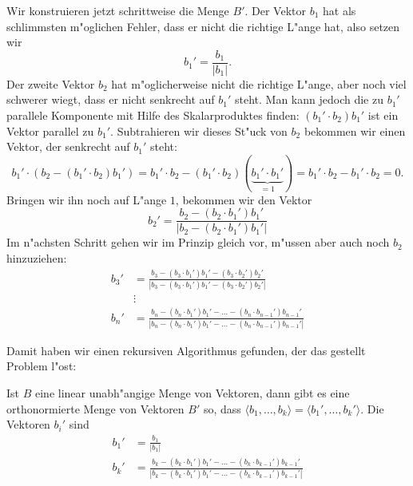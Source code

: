Wir konstruieren jetzt schrittweise die Menge $B'$.
Der Vektor $b_1$ hat als schlimmsten m"oglichen Fehler, dass er
nicht die richtige L"ange hat, also setzen wir
\[
b_1' = \frac{b_1}{|b_1|}.
\]
Der zweite Vektor $b_2$ hat m"oglicherweise nicht die richtige L"ange,
aber noch viel schwerer wiegt, dass er nicht senkrecht auf $b_1'$
steht. Man kann jedoch die zu $b_1'$ parallele Komponente mit Hilfe
des Skalarproduktes finden: $(b_1'\cdot b_2)b_1'$ ist ein Vektor
parallel zu $b_1'$. Subtrahieren wir dieses St"uck von $b_2$ bekommen
wir einen Vektor, der senkrecht auf $b_1'$ steht:
\[
b_1'\cdot(b_2-(b_1'\cdot b_2)b_1')=
b_1'\cdot b_2-(b_1'\cdot b_2)(\underbrace{b_1'\cdot b_1'}_{=1})
=
b_1'\cdot b_2-
b_1'\cdot b_2=0.
\]
Bringen wir ihn noch auf L"ange $1$, bekommen wir den Vektor
\[
b_2'=\frac{
b_2-(b_2\cdot b_1')b_1'
}{
|b_2-(b_2\cdot b_1')b_1'|
}
\]
Im n"achsten Schritt gehen wir im Prinzip gleich vor, m"ussen aber
auch noch $b_2$ hinzuziehen:
\begin{align*}
b_3'&=\frac{
b_3-(b_3\cdot b_1')b_1'-(b_3\cdot b_2')b_2'
}{
|b_3-(b_3\cdot b_1')b_1'-(b_3\cdot b_2')b_2'|
}
\\
&\vdots
\\
b_n'&=\frac{
b_n-(b_n\cdot b_1')b_1'-\dots-(b_n\cdot b_{n-1}')b_{n-1}'
}{
|b_n-(b_n\cdot b_1')b_1'-\dots-(b_n\cdot b_{n-1}')b_{n-1}'|
}
\end{align*}

Damit haben wir einen rekursiven Algorithmus gefunden,
der das gestellt Problem l"ost:

\begin{satz} Ist $B$ eine linear unabh"angige Menge von Vektoren,
dann gibt es eine orthonormierte Menge von Vektoren $B'$ so, dass
$\langle b_1,\dots,b_k\rangle=\langle b_1',\dots,b_k'\rangle$. Die
Vektoren $b_i'$ sind
\begin{align*}
b_1'&=\frac{b_1}{|b_1|}\\
b_k'&=\frac{b_k-(b_k\cdot b_1')b_1'-\dots -(b_k\cdot b_{k-1}')b_{k-1}'}%
{|b_k-(b_k\cdot b_1')b_1'-\dots -(b_k\cdot b_{k-1}')b_{k-1}'|}
\end{align*}
\end{satz}

